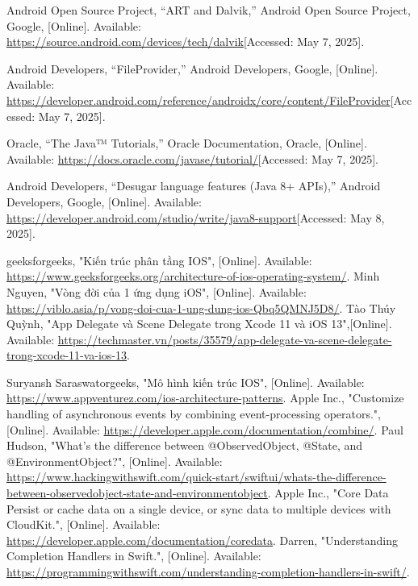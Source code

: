 \documentclass[12pt]{report}
\begin{document}
\begin{thebibliography}{1}
  Android Open Source Project, “ART and Dalvik,” Android Open Source Project, Google, [Online]. Available: \url{https://source.android.com/devices/tech/dalvik}[Accessed: May 7, 2025].
 
  Android Developers, “FileProvider,” Android Developers, Google, [Online]. Available: \url{https://developer.android.com/reference/androidx/core/content/FileProvider}[Accessed: May 7, 2025].
 
  Oracle, “The Java™ Tutorials,” Oracle Documentation, Oracle, [Online]. Available: \url{https://docs.oracle.com/javase/tutorial/}[Accessed: May 7, 2025].
 
  Android Developers, “Desugar language features (Java 8+ APIs),” Android Developers, Google, [Online]. Available: \url{https://developer.android.com/studio/write/java8-support}[Accessed: May 8, 2025].
 
  
 geeksforgeeks, "Kiến trúc phân tầng IOS", [Online]. Available: \url{https://www.geeksforgeeks.org/architecture-of-ios-operating-system/}.
  Minh Nguyen, "Vòng đời của 1 ứng dụng iOS", [Online]. Available: \url{https://viblo.asia/p/vong-doi-cua-1-ung-dung-ios-Qbq5QMNJ5D8/}.
Tào Thúy Quỳnh, "App Delegate và Scene Delegate trong Xcode 11 và iOS 13",[Online]. Available: \url{https://techmaster.vn/posts/35579/app-delegate-va-scene-delegate-trong-xcode-11-va-ios-13}.

Suryansh Saraswatorgeeks, "Mô hình kiến trúc IOS", [Online]. Available: \url{https://www.appventurez.com/ios-architecture-patterns}.
Apple Inc., "Customize handling of asynchronous events by combining event-processing operators.", [Online]. Available: \url{https://developer.apple.com/documentation/combine/}.
 Paul Hudson, "What’s the difference between @ObservedObject, @State, and @EnvironmentObject?", [Online]. Available: \url{https://www.hackingwithswift.com/quick-start/swiftui/whats-the-difference-between-observedobject-state-and-environmentobject}.
 Apple Inc., "Core Data Persist or cache data on a single device, or sync data to multiple devices with CloudKit.", [Online]. Available: \url{https://developer.apple.com/documentation/coredata}.
 Darren, "Understanding Completion Handlers in Swift.", [Online]. Available: \url{https://programmingwithswift.com/understanding-completion-handlers-in-swift/}.
\end{thebibliography}
\end{document}
